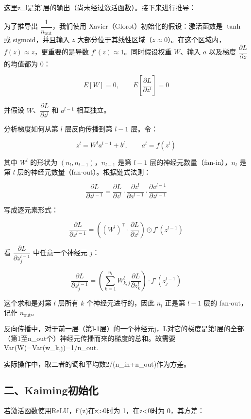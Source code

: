 这里z\_l是第l层的输出（尚未经过激活函数）。接下来进行推导：

为了推导出 \(\dfrac{1}{n_{\mathrm{out}}}\)，我们使用 Xavier（Glorot）初始化的假设：激活函数是 \(\tanh\) 或 sigmoid，并且输入 \(z\) 大部分位于其线性区域（\(z\approx 0\)）。在这个区域内，\(f(z)\approx z\)，更重要的是导数 \(f'(z)\approx 1\)。同时假设权重 \(W\)、输入 \(a\) 以及梯度 \(\dfrac{\partial L}{\partial z}\) 的均值都为 0：

\[
E[W]=0,\qquad E\left[\frac{\partial L}{\partial z^l}\right]=0
\]

并假设 \(W\)、\(\dfrac{\partial L}{\partial z^l}\) 和 \(a^{l-1}\) 相互独立。

分析梯度如何从第 \(l\) 层反向传播到第 \(l-1\) 层。令：

\[
z^l=W^la^{l-1}+b^l,\qquad a^l=f(z^l)
\]

其中 \(W^l\) 的形状为 \((n_l,n_{l-1})\)，\(n_{l-1}\) 是第 \(l-1\) 层的神经元数量（fan-in），\(n_l\) 是第 \(l\) 层的神经元数量（fan-out）。根据链式法则：

\[
\frac{\partial L}{\partial z^{l-1}}
=\frac{\partial L}{\partial z^l}\cdot
\frac{\partial z^l}{\partial a^{l-1}}\cdot
\frac{\partial a^{l-1}}{\partial z^{l-1}}
\]

写成逐元素形式：

\[
\frac{\partial L}{\partial z^{l-1}}
=\left((W^l)^\top\cdot\frac{\partial L}{\partial z^l}\right)
\odot f'(z^{l-1})
\]

看 \(\dfrac{\partial L}{\partial z_j^{l-1}}\) 中任意一个神经元 \(j\)：

\[
\frac{\partial L}{\partial z_j^{l-1}}
=\left(\sum_{k=1}^{n_l}W^l_{k,j}\frac{\partial L}{\partial z_k^l}\right)\cdot f'(z_j^{l-1})
\]

这个求和是对第 \(l\) 层所有 \(k\) 个神经元进行的，因此 \(n_l\) 正是第 \(l-1\) 层的 fan-out，记作 \(n_{\mathrm{out}}\)。

反向传播中，对于前一层（第l-1层）的一个神经元j，L对它的梯度是第l层的全部（第1至n\_out个）神经元传播而来的梯度的总和。故需要Var(W)=Var(w\_k,j)=1/n\_out.

实际操作中，取二者的调和平均数2/(n\_in+n\_out)作为方差。

\hypertarget{ux4e8ckaimingux521dux59cbux5316}{%
\subsection{二、Kaiming初始化}\label{ux4e8ckaimingux521dux59cbux5316}}

若激活函数使用ReLU，f'(z)在z\textgreater0时为 1，在z\textless0时为 0，其方差：

